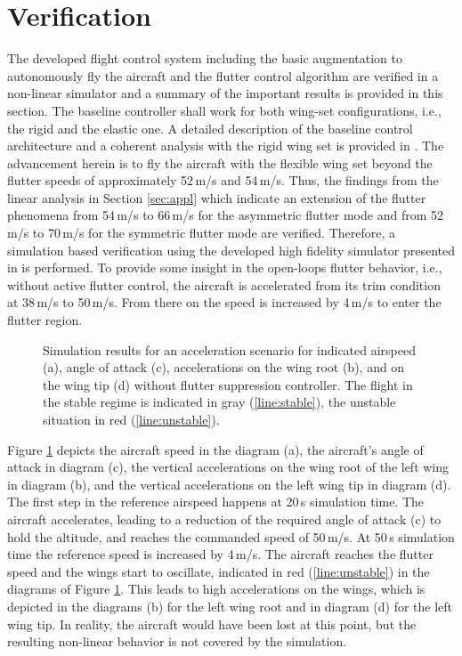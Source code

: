 \documentclass[aerospace,article,submit,moreauthors,pdftex,10pt,a4paper]{Definitions/mdpi}
\begin{document}
\section{Verification}\label{sec:verif}
The developed flight control system including the basic augmentation to autonomously fly the aircraft and the flutter control algorithm are verified in a non-linear simulator and a summary of the important results is provided in this section. The  baseline controller  shall work for both wing-set configurations, i.e., the rigid and the elastic one. A detailed description of the baseline control architecture and a coherent analysis with the rigid wing set is provided in \cite{Ossmann19a}. The advancement herein is to fly the aircraft with the flexible wing set beyond the flutter speeds of approximately 52\,m/s and 54\,m/s. Thus, the findings from the linear analysis in Section \ref{sec:appl} which indicate an extension of the flutter phenomena from 54\,m/s to 66\,m/s for the asymmetric flutter mode and from 52\,m/s to 70\,m/s for the symmetric flutter mode 
are verified. Therefore, a simulation based verification using the developed high fidelity simulator presented in  \cite{Wuestenhagen18} is performed.  To provide some insight in the open-loops flutter behavior, i.e., without active flutter control, the aircraft is accelerated from its trim condition at 38\,m/s to 50\,m/s. From there on the speed is increased by 4\,m/s to enter the flutter region.

\begin{figure}[h]
	\centering
	
	\caption{Simulation results for an acceleration scenario for indicated airspeed (a), angle of attack (c), accelerations on the wing root (b), and on the wing tip (d) without flutter suppression controller. The flight in the stable regime is indicated in gray (\ref{line:stable}), the unstable situation in red (\ref{line:unstable}). }
	\label{fig:ol}	
\end{figure}

Figure \ref{fig:ol} depicts the aircraft speed in the diagram (a), the aircraft's angle of attack in diagram (c), the vertical accelerations on the wing root of the left wing in diagram (b), and the vertical accelerations on the left wing tip in  diagram (d). The first step in the reference airspeed happens at 20\,s simulation time. The aircraft accelerates, leading to a reduction of the required angle of attack (c) to hold the altitude, and reaches the commanded speed of 50\,m/s. At 50\,s simulation time the reference speed is increased by 4\,m/s. The aircraft reaches the flutter speed and the wings start to oscillate, indicated in red (\ref{line:unstable}) in the diagrams of Figure \ref{fig:ol}. This leads to high accelerations on the wings, which is depicted in the diagrams (b) for the left wing root and in diagram (d) for the left wing tip. In reality, the aircraft would have been lost at this point, but the resulting non-linear behavior is not covered by the simulation.
\end{document}

